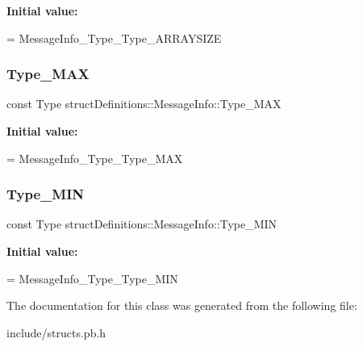 {\bfseries Initial value\+:}
\begin{DoxyCode}
=
    MessageInfo\_Type\_Type\_ARRAYSIZE
\end{DoxyCode}
\hypertarget{classstruct_definitions_1_1_message_info_a2ebb281e2f617c12a9b6e35ee4a4970c}{}\label{classstruct_definitions_1_1_message_info_a2ebb281e2f617c12a9b6e35ee4a4970c} 
\subsubsection{\texorpdfstring{Type\+\_\+\+M\+AX}{Type\_MAX}}
{\footnotesize\ttfamily const Type struct\+Definitions\+::\+Message\+Info\+::\+Type\+\_\+\+M\+AX\hspace{0.3cm}{\ttfamily [static]}}

{\bfseries Initial value\+:}
\begin{DoxyCode}
=
    MessageInfo\_Type\_Type\_MAX
\end{DoxyCode}
\hypertarget{classstruct_definitions_1_1_message_info_a4b3cceebe76dd3d8c7e8cbd980c03292}{}\label{classstruct_definitions_1_1_message_info_a4b3cceebe76dd3d8c7e8cbd980c03292} 
\subsubsection{\texorpdfstring{Type\+\_\+\+M\+IN}{Type\_MIN}}
{\footnotesize\ttfamily const Type struct\+Definitions\+::\+Message\+Info\+::\+Type\+\_\+\+M\+IN\hspace{0.3cm}{\ttfamily [static]}}

{\bfseries Initial value\+:}
\begin{DoxyCode}
=
    MessageInfo\_Type\_Type\_MIN
\end{DoxyCode}


The documentation for this class was generated from the following file\+:\begin{DoxyCompactItemize}
\item 
include/structs.\+pb.\+h\end{DoxyCompactItemize}
